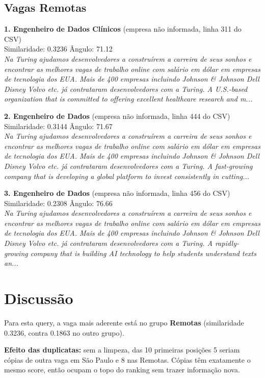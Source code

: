 \documentclass{article}%
\begin{document}
\subsection{Vagas Remotas}%
\label{subsec:VagasRemotas}%
\textbf{1. Engenheiro de Dados Clínicos} (empresa não informada, linha 311 do CSV)\\%
Similaridade: 0.3236 \quad Ângulo: 71.12\textdegree\\%
\textit{Na Turing ajudamos desenvolvedores a construírem a carreira de seus sonhos e encontrar as melhores vagas de trabalho online com salário em dólar em empresas de tecnologia dos EUA. Mais de 400 empresas incluindo Johnson \& Johnson Dell Disney Volvo etc. já contrataram desenvolvedores com a Turing. A U.S.-based organization that is committed to offering excellent healthcare research and m...}\par\medskip%
\textbf{2. Engenheiro de Dados} (empresa não informada, linha 444 do CSV)\\%
Similaridade: 0.3144 \quad Ângulo: 71.67\textdegree\\%
\textit{Na Turing ajudamos desenvolvedores a construírem a carreira de seus sonhos e encontrar as melhores vagas de trabalho online com salário em dólar em empresas de tecnologia dos EUA. Mais de 400 empresas incluindo Johnson \& Johnson Dell Disney Volvo etc. já contrataram desenvolvedores com a Turing. A fast-growing company that is developing a global platform to invest consistently in cutting...}\par\medskip%
\textbf{3. Engenheiro de Dados} (empresa não informada, linha 456 do CSV)\\%
Similaridade: 0.2308 \quad Ângulo: 76.66\textdegree\\%
\textit{Na Turing ajudamos desenvolvedores a construírem a carreira de seus sonhos e encontrar as melhores vagas de trabalho online com salário em dólar em empresas de tecnologia dos EUA. Mais de 400 empresas incluindo Johnson \& Johnson Dell Disney Volvo etc. já contrataram desenvolvedores com a Turing. A rapidly-growing company that is building AI technology to help students understand texts an...}\par\medskip

%
\section{Discussão}%
\label{sec:Discusso}%
Para esta query, a vaga mais aderente está no grupo \textbf{Remotas} (similaridade 0.3236, contra 0.1863 no outro grupo).\par\medskip%
\textbf{Efeito das duplicatas:} sem a limpeza, das 10 primeiras posições 5 seriam cópias de outra vaga em São Paulo e 8 nas Remotas. Cópias têm exatamente o mesmo score, então ocupam o topo do ranking sem trazer informação nova.\par

%
\end{document}
